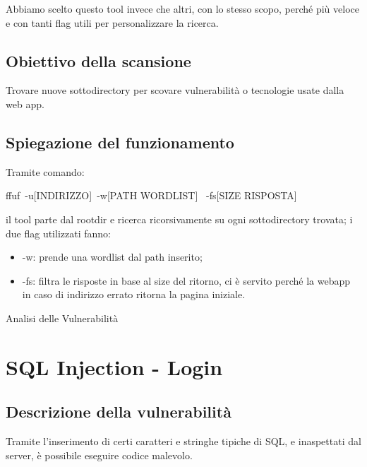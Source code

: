 \documentclass[
]{article}
\providecommand{\tightlist}{%
  \setlength{\itemsep}{0pt}\setlength{\parskip}{0pt}}
\begin{document}
{Abbiamo scelto questo tool invece che altri, con lo stesso scopo,
perché più veloce e con tanti flag utili per personalizzare la ricerca.}

\subsection{\texorpdfstring{{Obiettivo della
scansione}}{Obiettivo della scansione}}\label{h.t277em3zvhs1}

{Trovare nuove sottodirectory per scovare vulnerabilità o tecnologie
usate dalla web app.}

\subsection{\texorpdfstring{{Spiegazione del
funzionamento}}{Spiegazione del funzionamento}}\label{h.fwcmrnwiwxed}

{Tramite comando:}

{ffuf}{~}{-u{[}INDIRIZZO{]}}{~-w{[}PATH WORDLIST{]} ~-fs{[}SIZE
RISPOSTA{]}}

{}

{il tool parte dal rootdir e ricerca ricorsivamente su ogni
sottodirectory trovata; i due flag utilizzati fanno:}

\begin{itemize}
\tightlist
\item
  {-w}{: prende una wordlist dal path inserito;}
\item
  {-fs}{: filtra le risposte in base al size del ritorno, ci è servito
  perché la webapp in caso di indirizzo errato ritorna la pagina
  iniziale.}
\end{itemize}

{}

{}

{Analisi delle Vulnerabilità }

\section{\texorpdfstring{{SQL Injection -
Login}}{SQL Injection - Login}}\label{h.hanyn33oswiy}

\subsection{\texorpdfstring{{Descrizione della
vulnerabilità}}{Descrizione della vulnerabilità}}\label{h.wlp9x9bbg7lc}

{Tramite l'inserimento di certi caratteri e stringhe tipiche di SQL, e
inaspettati dal server, è possibile eseguire codice malevolo.}
\end{document}
